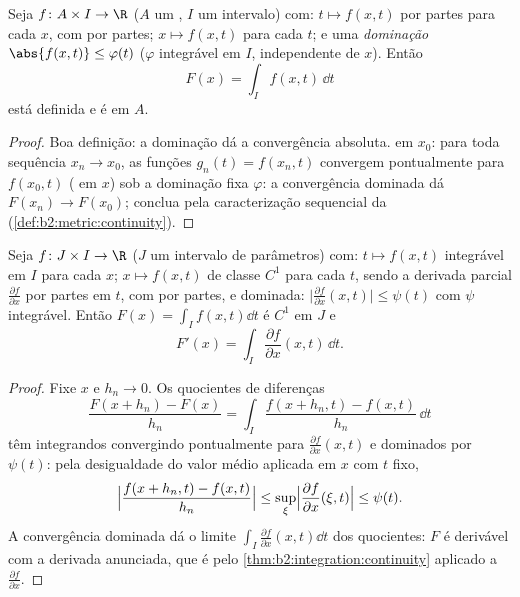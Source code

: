\begin{theorem}\label{thm:b2:integration:continuity}
Seja $f \colon A \times I \to \R$ ($A$ um , $I$ um
intervalo) com: $t \mapsto f(x, t)$  por partes para cada
$x$, com  por partes; $x \mapsto f(x, t)$  para cada $t$; e uma
\emph{dominação} $\abs{f(x,t)} \leq \varphi(t)$ ($\varphi$
integrável em $I$, independente de $x$). Então
\[
F(x) = \int_I f(x, t)\,\dd t
\]
está definida e é  em $A$.
\end{theorem}

\begin{proof}
Boa definição: a dominação dá a convergência absoluta.  em
$x_0$: para toda sequência $x_n \to x_0$, as funções $g_n(t) =
f(x_n, t)$ convergem pontualmente para $f(x_0, t)$ ( em $x$)
sob a dominação fixa $\varphi$: a convergência dominada dá
$F(x_n) \to F(x_0)$; conclua pela caracterização sequencial da
 (\cref{def:b2:metric:continuity}).
\end{proof}

\begin{theorem}\label{thm:b2:integration:leibnizrule}
Seja $f \colon J \times I \to \R$ ($J$ um intervalo de parâmetros)
com: $t \mapsto f(x,t)$ integrável em $I$ para cada $x$; $x \mapsto
f(x,t)$ de classe $C^1$ para cada $t$, sendo a derivada parcial
$\frac{\partial f}{\partial x}$  por partes em $t$, com  por partes,
e dominada: $\bigl|\frac{\partial f}{\partial x}(x,t)\bigr| \leq
\psi(t)$ com $\psi$ integrável. Então $F(x) = \int_I f(x,t)\dd t$
é $C^1$ em $J$ e
\[
F'(x) = \int_I \frac{\partial f}{\partial x}(x, t)\,\dd t .
\]
\end{theorem}

\begin{proof}
Fixe $x$ e $h_n \to 0$. Os quocientes de diferenças
\[
\frac{F(x + h_n) - F(x)}{h_n}
= \int_I \frac{f(x + h_n, t) - f(x, t)}{h_n}\,\dd t
\]
têm integrandos convergindo pontualmente para $\frac{\partial f}{\partial
x}(x, t)$ e dominados por $\psi(t)$: pela desigualdade do valor
médio aplicada em $x$ com $t$ fixo,
\[
\Bigl|\frac{f(x + h_n, t) - f(x,t)}{h_n}\Bigr|
\leq \sup_{\xi} \Bigl|\frac{\partial f}{\partial x}(\xi, t)\Bigr|
\leq \psi(t) .
\]
A convergência dominada dá o limite $\int_I \frac{\partial
f}{\partial x}(x,t)\dd t$ dos quocientes: $F$ é derivável
com a derivada anunciada, que é  pelo
\cref{thm:b2:integration:continuity} aplicado a $\frac{\partial
f}{\partial x}$.
\end{proof}

